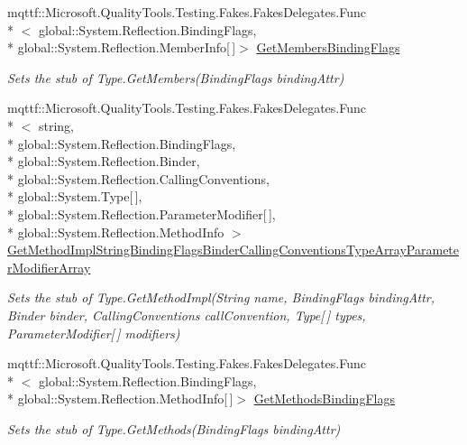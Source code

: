 \begin{DoxyCompactItemize}
mqttf\-::\-Microsoft.\-Quality\-Tools.\-Testing.\-Fakes.\-Fakes\-Delegates.\-Func\\*
$<$ global\-::\-System.\-Reflection.\-Binding\-Flags, \\*
global\-::\-System.\-Reflection.\-Member\-Info\mbox{[}$\,$\mbox{]}$>$ \hyperlink{class_system_1_1_fakes_1_1_stub_type_a5274e83ffe727ac5b88c7f5b6a9be5bd}{Get\-Members\-Binding\-Flags}
\begin{DoxyCompactList}\small\item\em Sets the stub of Type.\-Get\-Members(\-Binding\-Flags binding\-Attr)\end{DoxyCompactList}\item 
mqttf\-::\-Microsoft.\-Quality\-Tools.\-Testing.\-Fakes.\-Fakes\-Delegates.\-Func\\*
$<$ string, \\*
global\-::\-System.\-Reflection.\-Binding\-Flags, \\*
global\-::\-System.\-Reflection.\-Binder, \\*
global\-::\-System.\-Reflection.\-Calling\-Conventions, \\*
global\-::\-System.\-Type\mbox{[}$\,$\mbox{]}, \\*
global\-::\-System.\-Reflection.\-Parameter\-Modifier\mbox{[}$\,$\mbox{]}, \\*
global\-::\-System.\-Reflection.\-Method\-Info $>$ \hyperlink{class_system_1_1_fakes_1_1_stub_type_a4110ef59e8f9fefaaafaac6d97ef71ab}{Get\-Method\-Impl\-String\-Binding\-Flags\-Binder\-Calling\-Conventions\-Type\-Array\-Parameter\-Modifier\-Array}
\begin{DoxyCompactList}\small\item\em Sets the stub of Type.\-Get\-Method\-Impl(\-String name, Binding\-Flags binding\-Attr, Binder binder, Calling\-Conventions call\-Convention, Type\mbox{[}$\,$\mbox{]} types, Parameter\-Modifier\mbox{[}$\,$\mbox{]} modifiers)\end{DoxyCompactList}\item 
mqttf\-::\-Microsoft.\-Quality\-Tools.\-Testing.\-Fakes.\-Fakes\-Delegates.\-Func\\*
$<$ global\-::\-System.\-Reflection.\-Binding\-Flags, \\*
global\-::\-System.\-Reflection.\-Method\-Info\mbox{[}$\,$\mbox{]}$>$ \hyperlink{class_system_1_1_fakes_1_1_stub_type_a74b0d9b57a4a9316253c5a2263e3311b}{Get\-Methods\-Binding\-Flags}
\begin{DoxyCompactList}\small\item\em Sets the stub of Type.\-Get\-Methods(\-Binding\-Flags binding\-Attr)\end{DoxyCompactList}\item 

\end{DoxyCompactItemize}
